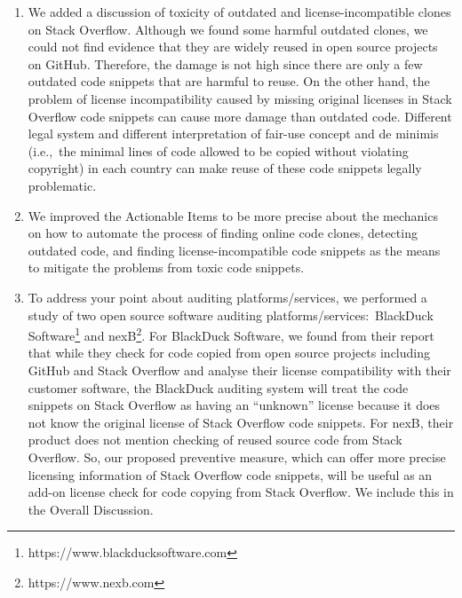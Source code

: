 \documentclass[a4paper,twoside,10pt]{reviewresponse}
\begin{document}
\begin{enumerate} \item We added a discussion of toxicity of outdated and
	license-incompatible clones on Stack Overflow. Although we found some harmful
	outdated clones, we could not find evidence that they are widely reused in open
	source projects on GitHub. Therefore, the damage is not high since there are only
	a few outdated code snippets that are harmful to reuse. On the other hand, the
	problem of license incompatibility caused by missing original licenses in Stack
	Overflow code snippets can cause more damage than outdated code. Different legal
	system and different interpretation of fair-use concept and de minimis (i.e.,~the
	minimal lines of code allowed to be copied without violating copyright) in each
	country can make reuse of these code snippets legally problematic.
	
	\item We improved the Actionable Items to be more precise about the mechanics
	on how to automate the process of finding online code clones, detecting
	outdated code, and finding license-incompatible code snippets as the means
	to mitigate the problems from toxic code snippets.
	
	\item To address your point about auditing platforms/services, we performed a
	study of two open source software auditing platforms/services:~BlackDuck
	Software\footnote{https://www.blackducksoftware.com} and
	nexB\footnote{https://www.nexb.com}. For BlackDuck Software, we found from
	their report~\cite{CORSI2017} that while they check for code copied from open
	source projects including GitHub and Stack Overflow and analyse their license
	compatibility with their customer software, the BlackDuck auditing system will
	treat the code snippets on Stack Overflow as having an ``unknown'' license because
	it does not know the original license of Stack Overflow code snippets. For
	nexB, their product does not mention checking of reused source code from Stack
	Overflow. So, our proposed preventive measure, which can offer more precise
	licensing information of Stack Overflow code snippets, will be useful as an
	add-on license check for code copying from Stack Overflow. We include this in
	the Overall Discussion. \end{enumerate}

\end{document}
